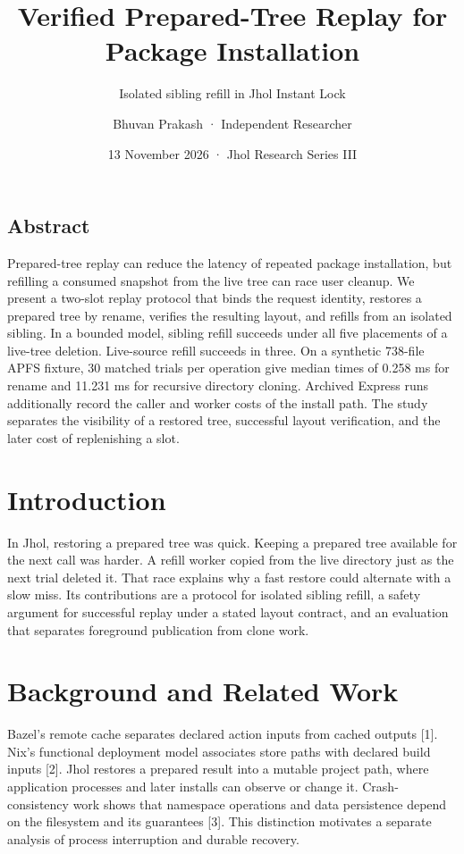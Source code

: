 \documentclass[
  11pt,
  letterpaper,
]{article}
\title{Verified Prepared-Tree Replay for Package Installation}
\subtitle{Isolated sibling refill in Jhol Instant Lock}
\author{Bhuvan Prakash · Independent Researcher}
\date{13 November 2026 · Jhol Research Series III}
\begin{document}
\maketitle

\subsection*{Abstract}\label{abstract}

Prepared-tree replay can reduce the latency of repeated package
installation, but refilling a consumed snapshot from the live tree can
race user cleanup. We present a two-slot replay protocol that binds the
request identity, restores a prepared tree by rename, verifies the
resulting layout, and refills from an isolated sibling. In a bounded
model, sibling refill succeeds under all five placements of a live-tree
deletion. Live-source refill succeeds in three. On a synthetic 738-file
APFS fixture, 30 matched trials per operation give median times of 0.258
ms for rename and 11.231 ms for recursive directory cloning. Archived
Express runs additionally record the caller and worker costs of the
install path. The study separates the visibility of a restored tree,
successful layout verification, and the later cost of replenishing a
slot.

\section{Introduction}\label{introduction}

In Jhol, restoring a prepared tree was quick. Keeping a prepared tree
available for the next call was harder. A refill worker copied from the
live directory just as the next trial deleted it. That race explains why
a fast restore could alternate with a slow miss. Its contributions are a
protocol for isolated sibling refill, a safety argument for successful
replay under a stated layout contract, and an evaluation that separates
foreground publication from clone work.

\section{Background and Related Work}\label{background-and-related-work}

Bazel's remote cache separates declared action inputs from cached
outputs {[}1{]}. Nix's functional deployment model associates store
paths with declared build inputs {[}2{]}. Jhol restores a prepared
result into a mutable project path, where application processes and
later installs can observe or change it. Crash-consistency work shows
that namespace operations and data persistence depend on the filesystem
and its guarantees {[}3{]}. This distinction motivates a separate
analysis of process interruption and durable recovery.
\end{document}
